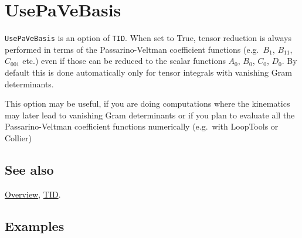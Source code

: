 \documentclass[../FeynCalcManual.tex]{subfiles}
\begin{document}
\hypertarget{usepavebasis}{
\section{UsePaVeBasis}\label{usepavebasis}}

\texttt{UsePaVeBasis} is an option of \texttt{TID}. When set to True,
tensor reduction is always performed in terms of the Passarino-Veltman
coefficient functions (e.g.~\(B_1\), \(B_{11}\), \(C_{001}\) etc.) even
if those can be reduced to the scalar functions \(A_0\), \(B_0\),
\(C_0\), \(D_0\). By default this is done automatically only for tensor
integrals with vanishing Gram determinants.

This option may be useful, if you are doing computations where the
kinematics may later lead to vanishing Gram determinants or if you plan
to evaluate all the Passarino-Veltman coefficient functions numerically
(e.g.~with LoopTools or Collier)

\subsection{See also}

\hyperlink{toc}{Overview}, \hyperlink{tid}{TID}.

\subsection{Examples}
\end{document}
